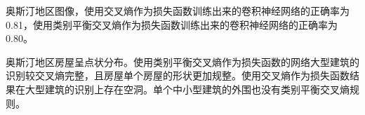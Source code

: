 \begin{figure}[htbp]
\end{figure}


奥斯汀地区图像，使用交叉熵作为损失函数训练出来的卷积神经网络的正确率为0.81，使用类别平衡交叉熵作为损失函数训练出来的卷积神经网络的正确率为0.80。

奥斯汀地区房屋呈点状分布。使用类别平衡交叉熵作为损失函数的网络大型建筑的识别较交叉熵完整，且房屋单个房屋的形状更加规整。使用交叉熵作为损失函数结果在大型建筑的识别上存在空洞。单个中小型建筑的外围也没有类别平衡交叉熵规则。

